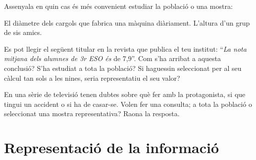 \begin{mylist}
 \exer Assenyala en quin cas és més convenient estudiar la població o una mostra:
\begin{tasks}
 \task El diàmetre dels cargols que fabrica una màquina diàriament. 
%
 \task L'altura d'un grup de sis amics. 
\end{tasks}
 

 \exer Es pot llegir el següent titular en la revista que publica el teu institut: ``\textit{La nota mitjana dels alumnes de 3r ESO és }de 7,9''. Com s'ha arribat a aquesta conclusió? S'ha estudiat a tota la població? Si haguessin seleccionat per al seu càlcul tan sols a les nines, seria representatiu el seu valor?


 \exer En una sèrie de televisió tenen dubtes sobre què fer amb la protagonista, si que tingui un accident o si ha de casar-se. Volen fer una consulta; a tota la població o seleccionat una mostra representativa? Raona la resposta.


\end{mylist}

\section{Representació de la informació}

\begin{center}
\end{center}

